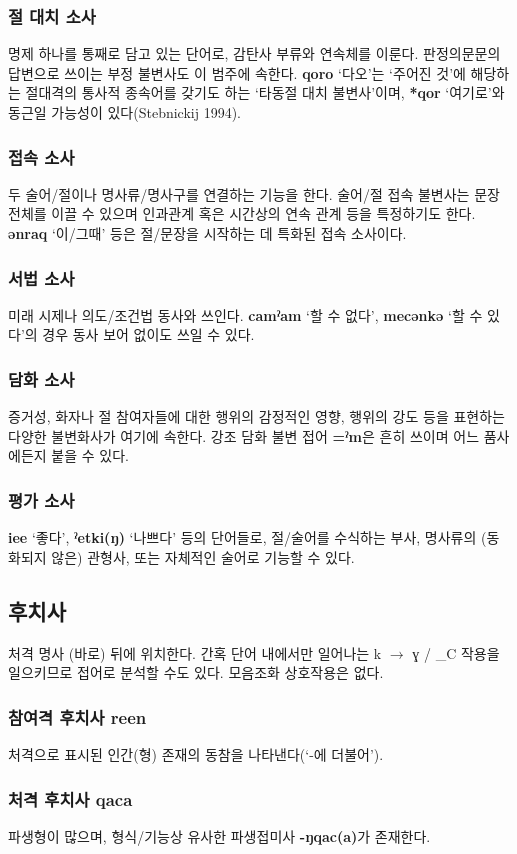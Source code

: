 \subsubsection{절 대치 소사}
명제 하나를 통째로 담고 있는 단어로, 감탄사 부류와 연속체를 이룬다. 판정의문문의 답변으로 쓰이는 부정 불변사도 이 범주에 속한다. \textbf{qoro} `다오'는 `주어진 것'에 해당하는 절대격의 통사적 종속어를 갖기도 하는 `타동절 대치 불변사'이며, \textbf{*qor} `여기로'와 동근일 가능성이 있다(Stebnickij 1994).
\subsubsection{접속 소사}
두 술어/절이나 명사류/명사구를 연결하는 기능을 한다. 술어/절 접속 불변사는 문장 전체를 이끌 수 있으며 인과관계 혹은 시간상의 연속 관계 등을 특정하기도 한다. \textbf{ənraq} `이/그때' 등은 절/문장을 시작하는 데 특화된 접속 소사이다.
\subsubsection{서법 소사}
미래 시제나 의도/조건법 동사와 쓰인다. \textbf{camˀam} ‘할 수 없다’, \textbf{mecənkə} ‘할 수 있다’의 경우 동사 보어 없이도 쓰일 수 있다.
\subsubsection{담화 소사}
증거성, 화자나 절 참여자들에 대한 행위의 감정적인 영향, 행위의 강도 등을 표현하는 다양한 불변화사가 여기에 속한다. 강조 담화 불변 접어 \textbf{=ˀm}은 흔히 쓰이며 어느 품사에든지 붙을 수 있다.
\subsubsection{평가 소사}
\textbf{iee} `좋다', \textbf{ˀetki(ŋ)} `나쁘다' 등의 단어들로, 절/술어를 수식하는 부사, 명사류의 (동화되지 않은) 관형사, 또는 자체적인 술어로 기능할 수 있다.
\subsection{후치사}
처격 명사 (바로) 뒤에 위치한다. 간혹 단어 내에서만 일어나는 k $\rightarrow$ ɣ / \_C 작용을 일으키므로 접어로 분석할 수도 있다. 모음조화 상호작용은 없다.
\subsubsection{참여격 후치사 \textbf{reen}}
처격으로 표시된 인간(형) 존재의 동참을 나타낸다(`-에 더불어').
\subsubsection{처격 후치사 \textbf{qaca}}
파생형이 많으며, 형식/기능상 유사한 파생접미사 \textbf{-ŋqac(a)}가 존재한다.

